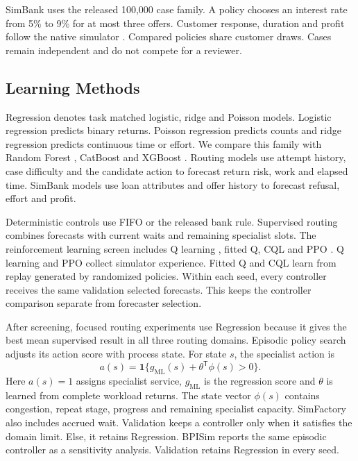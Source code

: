 \documentclass[conference]{IEEEtran}
\begin{document}
SimBank uses the released 100,000 case family. A policy chooses an interest rate from 5\% to 9\% for at most three offers. Customer response, duration and profit follow the native simulator \cite{simbank}. Compared policies share customer draws. Cases remain independent and do not compete for a reviewer.

\subsection{Learning Methods}

Regression denotes task matched logistic, ridge and Poisson models. Logistic regression predicts binary returns. Poisson regression predicts counts and ridge regression predicts continuous time or effort. We compare this family with Random Forest \cite{rf}, CatBoost \cite{cat} and XGBoost \cite{xgb}. Routing models use attempt history, case difficulty and the candidate action to forecast return risk, work and elapsed time. SimBank models use loan attributes and offer history to forecast refusal, effort and profit.

Deterministic controls use FIFO or the released bank rule. Supervised routing combines forecasts with current waits and remaining specialist slots. The reinforcement learning screen includes Q learning \cite{q}, fitted Q, CQL \cite{cql} and PPO \cite{ppo}. Q learning and PPO collect simulator experience. Fitted Q and CQL learn from replay generated by randomized policies. Within each seed, every controller receives the same validation selected forecasts. This keeps the controller comparison separate from forecaster selection.

After screening, focused routing experiments use Regression because it gives the best mean supervised result in all three routing domains. Episodic policy search adjusts its action score with process state. For state $s$, the specialist action is
\begin{equation}
 a(s)=\mathbf{1}\{g_{\mathrm{ML}}(s)+\theta^{\mathsf{T}}\phi(s)>0\}.
\end{equation}
Here $a(s)=1$ assigns specialist service, $g_{\mathrm{ML}}$ is the regression score and $\theta$ is learned from complete workload returns. The state vector $\phi(s)$ contains congestion, repeat stage, progress and remaining specialist capacity. SimFactory also includes accrued wait. Validation keeps a controller only when it satisfies the domain limit. Else, it retains Regression. BPISim reports the same episodic controller as a sensitivity analysis. Validation retains Regression in every seed.
\end{document}

